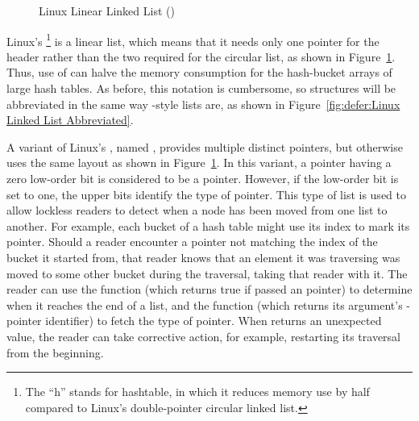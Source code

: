 \begin{figure}[tb]
\centering
{}
\caption{Linux Linear Linked List ()}
\label{fig:defer:Linux Linear Linked List (hlist)}
\end{figure}

Linux's \footnote{
	The ``h'' stands for hashtable, in which it reduces memory
	use by half compared to Linux's double-pointer circular
	linked list.}
is a linear list, which means that
it needs only one pointer for the header rather than the two
required for the circular list, as shown in
Figure~\ref{fig:defer:Linux Linear Linked List (hlist)}.
Thus, use of  can halve the memory consumption for the hash-bucket
arrays of large hash tables.
As before, this notation is cumbersome, so  structures will
be abbreviated in the same way -style lists are, as shown in
Figure~\ref{fig:defer:Linux Linked List Abbreviated}.

A variant of Linux's , named , provides multiple
distinct  pointers, but otherwise uses the same layout as shown in
Figure~\ref{fig:defer:Linux Linear Linked List (hlist)}.
In this variant, a  pointer having a zero low-order bit is
considered to be a pointer.
However, if the low-order bit is set to one, the upper bits identify
the type of  pointer.
This type of list is used to allow lockless readers to detect when a
node has been moved from one list to another.
For example, each bucket of a hash table might use its index to mark
its  pointer.
Should a reader encounter a  pointer not matching the index of
the bucket it started from, that reader knows that an element it was
traversing was moved to some other bucket during the traversal, taking
that reader with it.
The reader can use the  function (which returns true
if passed an   pointer) to determine when
it reaches the end of a list, and the  function
(which returns its argument's -pointer identifier) to fetch
the type of  pointer.
When  returns an unexpected value, the reader
can take corrective action, for example, restarting its traversal from
the beginning.

